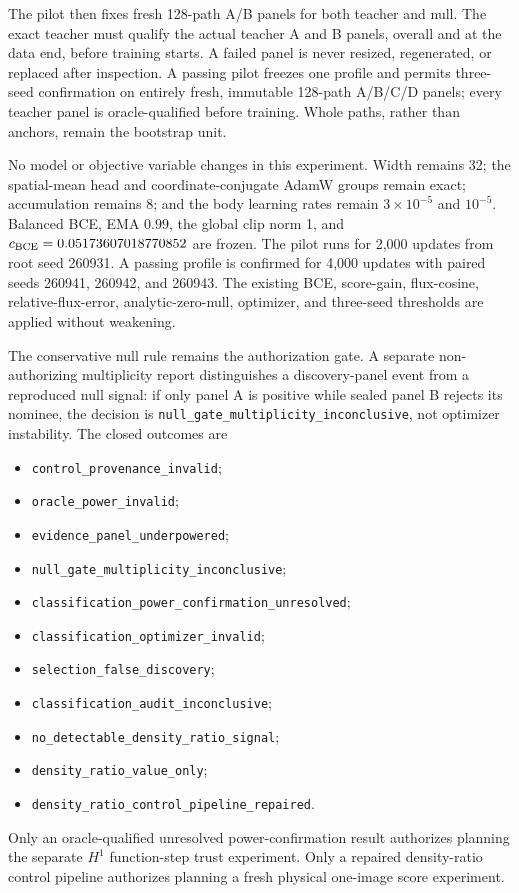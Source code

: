 \documentclass[11pt]{article}
\numberwithin{equation}{section}
\newcommand{\1}{\mathbf 1}
\begin{document}
The pilot then fixes fresh 128-path A/B panels for both teacher and null.  The
exact teacher must qualify the actual teacher A and B panels, overall and at
the data end, before training starts.  A failed panel is never resized,
regenerated, or replaced after inspection.  A passing pilot freezes one
profile and permits three-seed confirmation on entirely fresh, immutable
128-path A/B/C/D panels; every teacher panel is oracle-qualified before
training.  Whole paths, rather than anchors, remain the bootstrap unit.

No model or objective variable changes in this experiment.  Width remains
32; the spatial-mean head and coordinate-conjugate AdamW groups remain exact;
accumulation remains 8; and the body learning rates remain
\(3\mathbin{\times}10^{-5}\) and \(10^{-5}\).  Balanced BCE, EMA \(0.99\),
the global clip norm 1, and
\(c_{\rm BCE}=0.05173607018770852\) are frozen.  The pilot runs for 2,000
updates from root seed 260931.  A passing profile is confirmed for 4,000
updates with paired seeds 260941, 260942, and 260943.  The existing BCE,
score-gain, flux-cosine, relative-flux-error, analytic-zero-null, optimizer,
and three-seed thresholds are applied without weakening.

The conservative null rule remains the authorization gate.  A separate
non-authorizing multiplicity report distinguishes a discovery-panel event
from a reproduced null signal: if only panel A is positive while sealed panel
B rejects its nominee, the decision is
\nolinkurl{null_gate_multiplicity_inconclusive}, not optimizer instability.
The closed outcomes are
\begin{itemize}[leftmargin=1.5em]
  \item \nolinkurl{control_provenance_invalid};
  \item \nolinkurl{oracle_power_invalid};
  \item \nolinkurl{evidence_panel_underpowered};
  \item \nolinkurl{null_gate_multiplicity_inconclusive};
  \item \nolinkurl{classification_power_confirmation_unresolved};
  \item \nolinkurl{classification_optimizer_invalid};
  \item \nolinkurl{selection_false_discovery};
  \item \nolinkurl{classification_audit_inconclusive};
  \item \nolinkurl{no_detectable_density_ratio_signal};
  \item \nolinkurl{density_ratio_value_only};
  \item \nolinkurl{density_ratio_control_pipeline_repaired}.
\end{itemize}
Only an oracle-qualified unresolved power-confirmation result authorizes
planning the separate \(H^1\) function-step trust experiment.  Only a repaired
density-ratio control pipeline authorizes planning a fresh physical one-image
score experiment.
\end{document}
